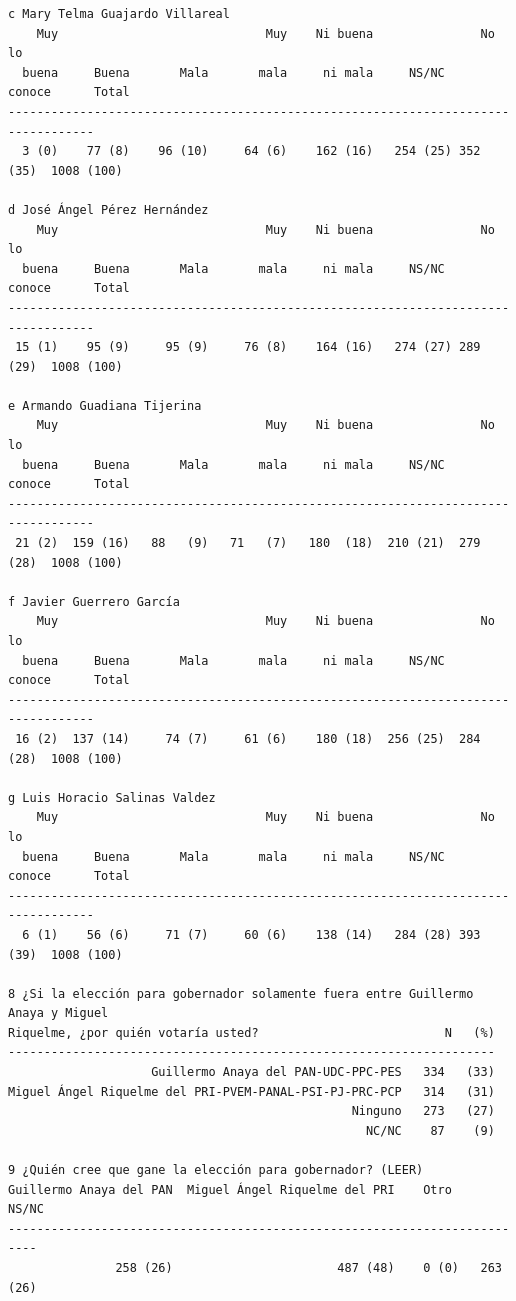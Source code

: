 \documentclass[letter,12pt]{article}
\begin{document}
\begin{scriptsize}
\begin{verbatim}
c Mary Telma Guajardo Villareal
    Muy                             Muy    Ni buena               No lo  
  buena     Buena       Mala       mala     ni mala     NS/NC    conoce      Total
----------------------------------------------------------------------------------
  3 (0)    77 (8)    96 (10)     64 (6)    162 (16)   254 (25) 352 (35)  1008 (100)

d José Ángel Pérez Hernández   
    Muy                             Muy    Ni buena               No lo  
  buena     Buena       Mala       mala     ni mala     NS/NC    conoce      Total
----------------------------------------------------------------------------------
 15 (1)    95 (9)     95 (9)     76 (8)    164 (16)   274 (27) 289 (29)  1008 (100)

e Armando Guadiana Tijerina    
    Muy                             Muy    Ni buena               No lo  
  buena     Buena       Mala       mala     ni mala     NS/NC    conoce      Total
----------------------------------------------------------------------------------
 21 (2)  159 (16)   88   (9)   71   (7)   180  (18)  210 (21)  279 (28)  1008 (100)

f Javier Guerrero García       
    Muy                             Muy    Ni buena               No lo  
  buena     Buena       Mala       mala     ni mala     NS/NC    conoce      Total
----------------------------------------------------------------------------------
 16 (2)  137 (14)     74 (7)     61 (6)    180 (18)  256 (25)  284 (28)  1008 (100)

g Luis Horacio Salinas Valdez  
    Muy                             Muy    Ni buena               No lo  
  buena     Buena       Mala       mala     ni mala     NS/NC    conoce      Total
----------------------------------------------------------------------------------
  6 (1)    56 (6)     71 (7)     60 (6)    138 (14)   284 (28) 393 (39)  1008 (100) 

8 ¿Si la elección para gobernador solamente fuera entre Guillermo Anaya y Miguel 
Riquelme, ¿por quién votaría usted?                          N   (%)
--------------------------------------------------------------------
                    Guillermo Anaya del PAN-UDC-PPC-PES   334   (33) 
Miguel Ángel Riquelme del PRI-PVEM-PANAL-PSI-PJ-PRC-PCP   314   (31) 
                                                Ninguno   273   (27) 
                                                  NC/NC    87    (9) 

9 ¿Quién cree que gane la elección para gobernador? (LEER)
Guillermo Anaya del PAN  Miguel Ángel Riquelme del PRI    Otro       NS/NC
--------------------------------------------------------------------------
               258 (26)                       487 (48)    0 (0)   263 (26) 


\end{verbatim}
\end{scriptsize}
\end{document}
